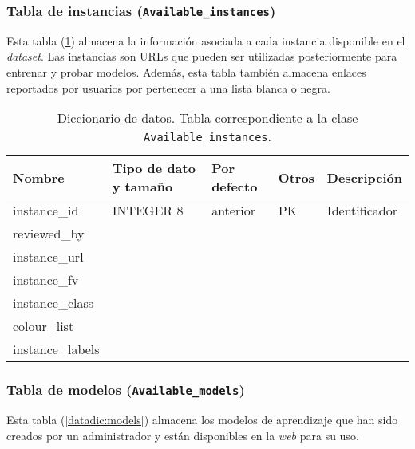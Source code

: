 \subsubsection{Tabla de instancias (\texttt{Available\_instances})}

Esta tabla (\ref{datadic:instances}) almacena la información asociada a cada instancia disponible en el \textit{dataset}. Las instancias son URLs que pueden ser utilizadas posteriormente para entrenar y probar modelos. Además, esta tabla también almacena enlaces reportados por usuarios por pertenecer a una lista blanca o negra.

\begin{table}
	\small
	\begin{centering}
		\begin{tabular}{@{}p{6em} p{6em} p{6em} p{6em} p{6em}@{}}
			\toprule
			\textbf{Nombre} & \textbf{Tipo de dato y tamaño} & \textbf{Por defecto}& \textbf{Otros} & \textbf{Descripción}\\
			\midrule
			instance\_id & INTEGER 8 & anterior & PK & Identificador \\
			reviewed\_by &  &  &  &  \\
			instance\_url &  &  &  &   \\
			instance\_fv &  &  &  &   \\
			instance\_class &  &  &  &   \\
			colour\_list &  &  &  &   \\
			instance\_labels &  &  &  &   \\
			\bottomrule
		\end{tabular}
	\end{centering}
	\caption[Diccionario de datos: Available\_instances]{Diccionario de datos. Tabla correspondiente a la clase \texttt{Available\_instances}.}
	\label{datadic:instances}
\end{table}


\subsubsection{Tabla de modelos (\texttt{Available\_models})}

Esta tabla (\ref{datadic:models}) almacena los modelos de aprendizaje que han sido creados por un administrador y están disponibles en la \textit{web} para su uso.

